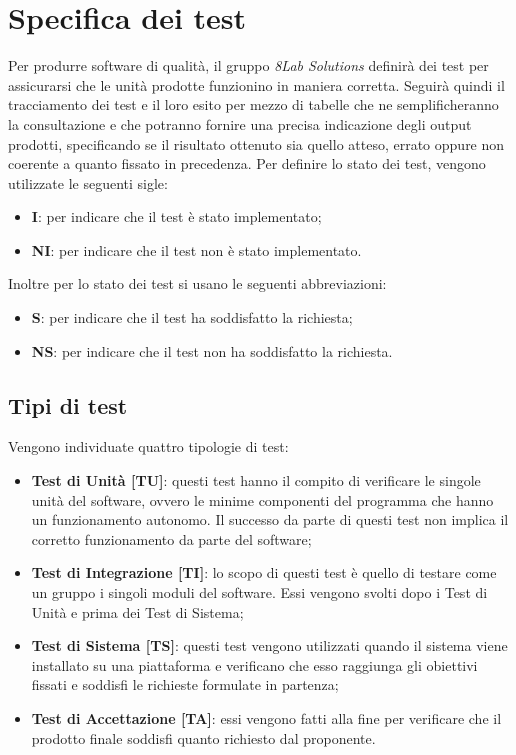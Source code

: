 \section{Specifica dei test}
Per produrre software di qualità, il gruppo \textit{8Lab Solutions} definirà dei 
test per assicurarsi che le unità prodotte funzionino in maniera corretta. 
Seguirà quindi il tracciamento dei test e il loro esito per mezzo di tabelle che ne
semplificheranno la consultazione e che potranno fornire una precisa indicazione 
degli output prodotti, specificando se il risultato ottenuto sia quello atteso, errato
oppure non coerente a quanto fissato in precedenza.
Per definire lo stato dei test, vengono utilizzate le seguenti sigle:
\begin{itemize}
	\item \textbf{I}: per indicare che il test è stato implementato;
	\item \textbf{NI}: per indicare che il test non è stato implementato.
\end{itemize}
Inoltre per lo stato dei test si usano le seguenti abbreviazioni:
\begin{itemize}
	\item \textbf{S}: per indicare che il test ha soddisfatto la richiesta;
	\item \textbf{NS}: per indicare che il test non ha soddisfatto la richiesta.
\end{itemize}

\subsection{Tipi di test}
Vengono individuate quattro tipologie di test:
\begin{itemize}
	\item \textbf{Test di Unità [TU]}: questi test hanno il compito di verificare le 
		singole unità del software, ovvero le minime componenti del programma che hanno 
		un funzionamento autonomo. Il successo da parte di questi test non implica il 
		corretto funzionamento da parte del software;
	\item \textbf{Test di Integrazione [TI]}: lo scopo di questi test è quello di 
		testare come un gruppo i singoli moduli\glo{} del software. Essi vengono svolti 
		dopo i Test di Unità e prima dei Test di Sistema; 
	\item \textbf{Test di Sistema [TS]}: questi test vengono utilizzati quando il 
		sistema viene installato su una piattaforma e verificano che esso raggiunga gli 
		obiettivi fissati e soddisfi le richieste formulate in partenza;
	\item \textbf{Test di Accettazione [TA]}: essi vengono fatti alla fine per 
		verificare che il prodotto finale soddisfi quanto richiesto dal proponente.
\end{itemize}

